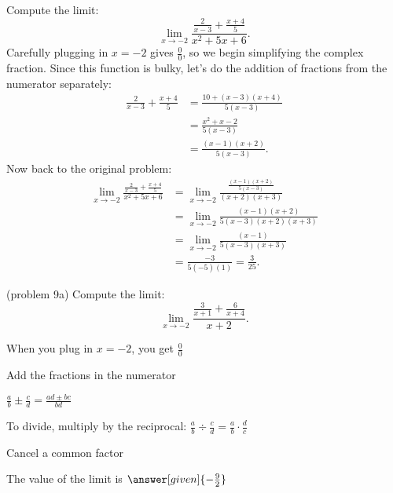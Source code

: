 \documentclass{ximera}
\begin{document}
\begin{example}[example 9]
Compute the limit:
\[\lim_{x \to -2} \frac{\frac{2}{x-3} + \frac{x+4}{5}}{x^2 + 5x + 6}.\]
Carefully plugging in $x=-2$ gives $\frac00$, so we begin simplifying the complex fraction.
Since this function is bulky, let's do the addition of fractions from the numerator separately:
\begin{align*}
\frac{2}{x-3} + \frac{x+4}{5} &= \frac{10 + (x-3)(x+4)}{5(x-3)}\\
&= \frac{x^2 +x -2}{5(x-3)} \\
&= \frac{(x-1)(x+2)}{5(x-3)}.
\end{align*}
Now back to the original problem:
\begin{align*}
\lim_{x \to -2} \frac{\frac{2}{x-3} + \frac{x+4}{5}}{x^2 + 5x + 6} &= 
\lim_{x \to -2} \frac{\frac{(x-1)(x+2)}{5(x-3)}}{(x+2)(x+3)}\\
&= \lim_{x \to -2} \frac{(x-1)(x+2)}{5(x-3)(x+2)(x+3)} \\
&= \lim_{x \to -2} \frac{(x-1)}{5(x-3)(x+3)}\\
&= \frac{-3}{5(-5)(1)} = \frac{3}{25}.
\end{align*}
\end{example}


\begin{problem}(problem 9a)
  Compute the limit:
  \[
  \lim_{x \to -2} \frac{\frac{3}{x+1} + \frac{6}{x+4}}{x+2}.
  \]
  
    \begin{hint}
      When you plug in $x = -2$, you get $\frac00$
    \end{hint}
    \begin{hint}
      Add the fractions in the numerator
    \end{hint}
    \begin{hint}
      $\frac{a}{b} \pm \frac{c}{d} = \frac{ad \pm bc}{bd}$
    \end{hint}
    \begin{hint}
      To divide, multiply by the reciprocal: $\frac{a}{b} \div \frac{c}{d} = \frac{a}{b} \cdot \frac{d}{c}$
    \end{hint}
    \begin{hint}
      Cancel a common factor 
    \end{hint}
		The value of the limit is
		 $\answer[given]{-\frac{9}{2}}$
		
\end{problem}
\end{document}
